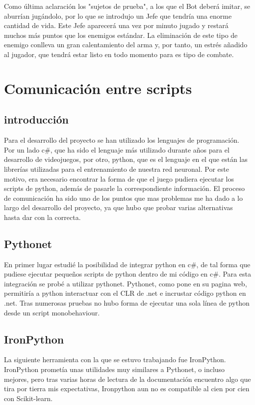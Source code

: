Como última aclaración los "sujetos de prueba", a los que el Bot deberá imitar, se aburrían jugándolo, por lo que se introdujo un Jefe que tendría una enorme cantidad de vida. Este Jefe aparecerá una vez por minuto jugado y restará muchos más puntos que los enemigos estándar. La eliminación de este tipo de enemigo conlleva un gran calentamiento del arma y, por tanto, un estrés añadido al jugador, que tendrá estar listo en todo momento para es tipo de combate.


\section{Comunicación entre scripts}

\subsection{introducción}
Para el desarrollo del proyecto se han utilizado los lenguajes de programación. Por un lado c#, que ha sido el lenguaje más utilizado durante años para el desarrollo de videojuegos, por otro, python, que es el lenguaje en el que están las librerías utilizadas para el entrenamiento de nuestra red neuronal. Por este motivo, era necesario encontrar la forma de que el juego pudiera ejecutar los scripts de python, además de pasarle la correspondiente información. El proceso de comunicación ha sido uno de los puntos que mas problemas me ha dado a lo largo del desarrollo del proyecto, ya que hubo que probar varias alternativas hasta dar con la correcta.

\subsection{Pythonet}
En primer lugar estudié la posibilidad de integrar python en c#, de tal forma que pudiese ejecutar pequeños scripts de python dentro de mi código en c#. Para esta integración se probé a utilizar pythonet. Pythonet, como pone en su pagina web, permitiría a python interactuar con el CLR de .net e incrustar código python en .net. Tras numerosas pruebas no hubo forma de ejecutar una sola línea de python desde un script monobehaviour.

\subsection{IronPython}
La siguiente herramienta con la que se estuvo trabajando fue IronPython. IronPython prometía unas utilidades muy similares a Pythonet, o incluso mejores, pero tras varias horas de lectura de la documentación encuentro algo que tira por tierra mis expectativas, Ironpython aun no es compatible al cien por cien con Scikit-learn.

